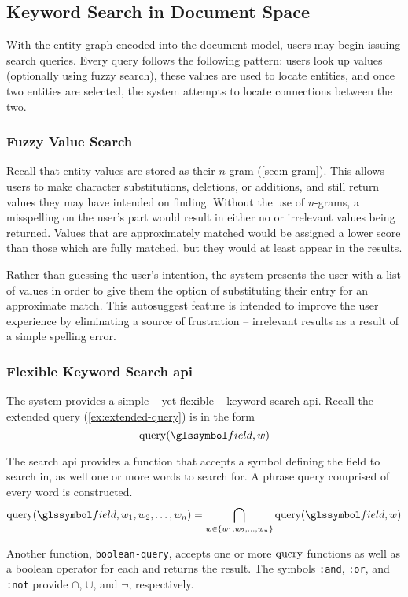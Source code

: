 	\subsection{Keyword Search in Document Space}
	\label{sec:keyword-search-document-space}
		With the entity graph encoded into the document model, users may begin issuing search queries.  Every query follows the following pattern:  users look up values (optionally using fuzzy search), these values are used to locate entities, and once two entities are selected, the system attempts to locate connections between the two.
		
		\subsubsection{Fuzzy Value Search}
			Recall that entity values are stored as their \(n\)-gram (\cref{sec:n-gram}).  This allows users to make character substitutions, deletions, or additions, and still return values they may have intended on finding.  Without the use of \(n\)-grams, a misspelling on the user's part would result in either no or irrelevant values being returned.  Values that are approximately matched would be assigned a lower score than those which are fully matched, but they would at least appear in the results.
			
			Rather than guessing the user's intention, the system presents the user with a list of values in order to give them the option of substituting their entry for an approximate match.  This autosuggest feature is intended to improve the user experience by eliminating a source of frustration -- irrelevant results as a result of a simple spelling error.
		
		\subsubsection{Flexible Keyword Search \gls{api}}
			The system provides a simple -- yet flexible -- keyword search \gls{api}.  Recall the extended query (\cref{ex:extended-query}) is in the form
			\[
				\query(\field, \w)
			\]
			
			The search \gls{api} provides a function that accepts a symbol defining the field to search in, as well one or more words to search for.  A phrase query comprised of every word is constructed.
			\[
				\query(\field, \w_1, \w_2, \dotsc, \w_n) = \bigcap_{\w \in \{\w_1, \w_2, \dotsc, \w_n\}} \query(\field, \w)
			\]
			
			Another function, \texttt{boolean-query}, accepts one or more \(\operatorname{query}\) functions as well as a boolean operator for each and returns the result.  The symbols \texttt{:and}, \texttt{:or}, and \texttt{:not} provide \(\cap\), \(\cup\), and \(\neg\), respectively.
			
